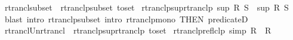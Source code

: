 \begin{isabellebody}
\endisatagproof
{\isafoldproof}%
%
\isadelimproof
\isanewline
%
\endisadelimproof
\isanewline
{}\isamarkupfalse%
\ rtrancl{\isacharunderscore}{\kern0pt}subset\ {\isacharequal}{\kern0pt}\ rtranclp{\isacharunderscore}{\kern0pt}subset\ {\isacharbrackleft}{\kern0pt}to{\isacharunderscore}{\kern0pt}set{\isacharbrackright}{\kern0pt}\isanewline
\isanewline
{}\isamarkupfalse%
\ rtranclp{\isacharunderscore}{\kern0pt}sup{\isacharunderscore}{\kern0pt}rtranclp{\isacharcolon}{\kern0pt}\ {\isachardoublequoteopen}{\isacharparenleft}{\kern0pt}sup\ {\isacharparenleft}{\kern0pt}R\isactrlsup {\isacharasterisk}{\kern0pt}\isactrlsup {\isacharasterisk}{\kern0pt}{\isacharparenright}{\kern0pt}\ {\isacharparenleft}{\kern0pt}S\isactrlsup {\isacharasterisk}{\kern0pt}\isactrlsup {\isacharasterisk}{\kern0pt}{\isacharparenright}{\kern0pt}{\isacharparenright}{\kern0pt}\isactrlsup {\isacharasterisk}{\kern0pt}\isactrlsup {\isacharasterisk}{\kern0pt}\ {\isacharequal}{\kern0pt}\ {\isacharparenleft}{\kern0pt}sup\ R\ S{\isacharparenright}{\kern0pt}\isactrlsup {\isacharasterisk}{\kern0pt}\isactrlsup {\isacharasterisk}{\kern0pt}{\isachardoublequoteclose}\isanewline
%
\isadelimproof
\ \ %
\endisadelimproof
%
\isatagproof
{}\isamarkupfalse%
\ {\isacharparenleft}{\kern0pt}blast\ intro{\isacharbang}{\kern0pt}{\isacharcolon}{\kern0pt}\ rtranclp{\isacharunderscore}{\kern0pt}subset\ intro{\isacharcolon}{\kern0pt}\ rtranclp{\isacharunderscore}{\kern0pt}mono\ {\isacharbrackleft}{\kern0pt}THEN\ predicate{}D{\isacharbrackright}{\kern0pt}{\isacharparenright}{\kern0pt}%
\endisatagproof
{\isafoldproof}%
%
\isadelimproof
\isanewline
%
\endisadelimproof
\isanewline
{}\isamarkupfalse%
\ rtrancl{\isacharunderscore}{\kern0pt}Un{\isacharunderscore}{\kern0pt}rtrancl\ {\isacharequal}{\kern0pt}\ rtranclp{\isacharunderscore}{\kern0pt}sup{\isacharunderscore}{\kern0pt}rtranclp\ {\isacharbrackleft}{\kern0pt}to{\isacharunderscore}{\kern0pt}set{\isacharbrackright}{\kern0pt}\isanewline
\isanewline
{}\isamarkupfalse%
\ rtranclp{\isacharunderscore}{\kern0pt}reflclp\ {\isacharbrackleft}{\kern0pt}simp{\isacharbrackright}{\kern0pt}{\isacharcolon}{\kern0pt}\ {\isachardoublequoteopen}{\isacharparenleft}{\kern0pt}R\isactrlsup {\isacharequal}{\kern0pt}\isactrlsup {\isacharequal}{\kern0pt}{\isacharparenright}{\kern0pt}\isactrlsup {\isacharasterisk}{\kern0pt}\isactrlsup {\isacharasterisk}{\kern0pt}\ {\isacharequal}{\kern0pt}\ R\isactrlsup {\isacharasterisk}{\kern0pt}\isactrlsup {\isacharasterisk}{\kern0pt}{\isachardoublequoteclose}\isanewline
%

\end{isabellebody}
